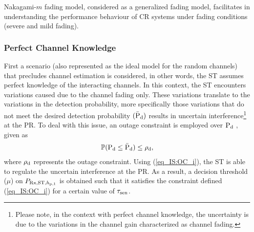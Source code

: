 Nakagami-$m$ fading model, considered as a generalized fading model, facilitates in understanding the performance behaviour of CR systems under fading conditions (severe and mild fading). 

\subsubsection{Perfect Channel Knowledge}
First a scenario (also represented as the ideal model for the random channels) that precludes channel estimation is considered, in other words, the ST assumes perfect knowledge of the interacting channels. In this context, the ST encounters variations caused due to the channel fading only. These variations translate to the variations in the detection probability, more specifically those variations that do not meet the desired detection probability $(\bar{\text{P}}_{\text{d}})$ results in uncertain interference\footnote{Please note, in the context with perfect channel knowledge, the uncertainty is due to the variations in the channel gain characterized as channel fading.} at the PR. To deal with this issue, an outage constraint is employed over $\text{P}_{\text{d}}$ \cite{Juarez11}, given as
\begin{align}
\mathbb P( \text{P}_{\text{d}} \le \bar{\text{P}}_{\text{d}}) \le \rho_{\text{d}}, \label{eq_IS:OC_i}
\end{align}
where $\rho_{\text{d}}$ represents the outage constraint. Using (\ref{eq_IS:OC_i}), the ST is able to regulate the uncertain interference at the PR. As a result, a decision threshold ($\mu$) on $P_{\text{Rx,ST,$h_{\text{p,1}}$}}$ is obtained such that it satisfies the constraint defined (\ref{eq_IS:OC_i}) for a certain value of $\tau_{\text{sen}}$.

